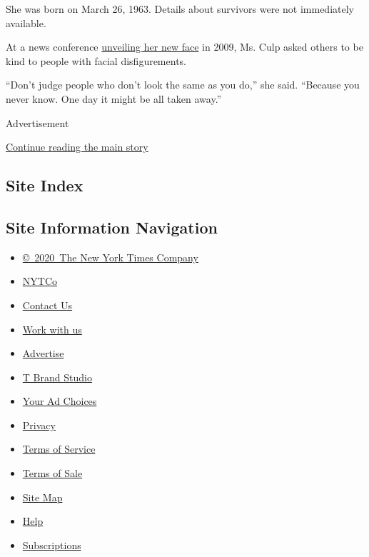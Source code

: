 She was born on March 26, 1963. Details about survivors were not
immediately available.

At a news conference
\href{https://www.nytimes3xbfgragh.onion/2009/05/06/science/06face.html}{unveiling
her new face} in 2009, Ms. Culp asked others to be kind to people with
facial disfigurements.

``Don't judge people who don't look the same as you do,'' she said.
``Because you never know. One day it might be all taken away.''

Advertisement

\protect\hyperlink{after-bottom}{Continue reading the main story}

\hypertarget{site-index}{%
\subsection{Site Index}\label{site-index}}

\hypertarget{site-information-navigation}{%
\subsection{Site Information
Navigation}\label{site-information-navigation}}

\begin{itemize}
\tightlist
\item
  \href{https://help.nytimes3xbfgragh.onion/hc/en-us/articles/115014792127-Copyright-notice}{©~2020~The
  New York Times Company}
\end{itemize}

\begin{itemize}
\tightlist
\item
  \href{https://www.nytco.com/}{NYTCo}
\item
  \href{https://help.nytimes3xbfgragh.onion/hc/en-us/articles/115015385887-Contact-Us}{Contact
  Us}
\item
  \href{https://www.nytco.com/careers/}{Work with us}
\item
  \href{https://nytmediakit.com/}{Advertise}
\item
  \href{http://www.tbrandstudio.com/}{T Brand Studio}
\item
  \href{https://www.nytimes3xbfgragh.onion/privacy/cookie-policy\#how-do-i-manage-trackers}{Your
  Ad Choices}
\item
  \href{https://www.nytimes3xbfgragh.onion/privacy}{Privacy}
\item
  \href{https://help.nytimes3xbfgragh.onion/hc/en-us/articles/115014893428-Terms-of-service}{Terms
  of Service}
\item
  \href{https://help.nytimes3xbfgragh.onion/hc/en-us/articles/115014893968-Terms-of-sale}{Terms
  of Sale}
\item
  \href{https://spiderbites.nytimes3xbfgragh.onion}{Site Map}
\item
  \href{https://help.nytimes3xbfgragh.onion/hc/en-us}{Help}
\item
  \href{https://www.nytimes3xbfgragh.onion/subscription?campaignId=37WXW}{Subscriptions}
\end{itemize}
